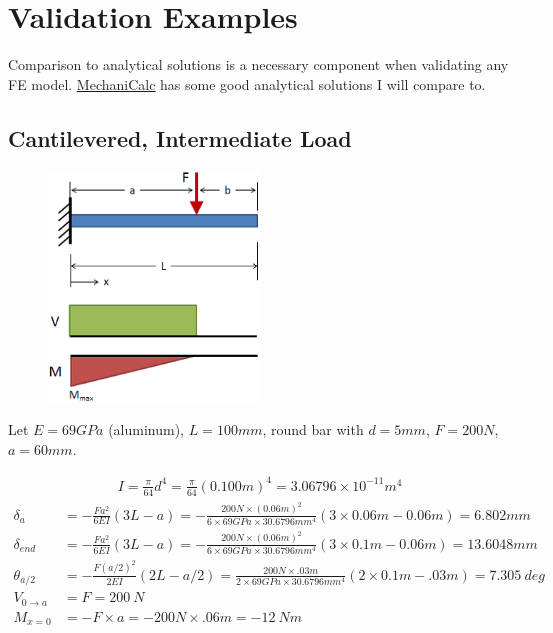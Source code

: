 \documentclass[10pt,letterpaper]{article}
\begin{document}
	\section{Validation Examples}

	Comparison to analytical solutions is a necessary component when validating any FE model. \href{https://mechanicalc.com/reference/beam-deflection-tables}{\underline{MechaniCalc}} has some good analytical solutions I will compare to.

	\newpage
	\subsection{Cantilevered, Intermediate Load}

	\begin{figure}[H]
		\includegraphics[width=0.5\textwidth]{beam_case1_schematic.png}
	\end{figure}

	Let $E = 69 GPa$ (aluminum), $L = 100 mm$, round bar with $d = 5 mm$, $F = 200 N$, $a = 60mm$.

	\begin{align}
		I = \frac{\pi}{64} d^4 = \frac{\pi}{64} (0.100 m)^4 = 3.06796 \times 10^{-11} m^4
	\end{align}
	\begin{align}
		\delta_{a} &= - \frac{F a^2}{6 E I} (3 L - a) = - \frac{200 N \times (0.06 m)^2}{6 \times 69 GPa \times 30.6796 mm^4} (3 \times 0.06 m - 0.06 m) = 6.802 mm\\
		\delta_{end} &= - \frac{F a^2}{6 E I} (3 L - a) = - \frac{200 N \times (0.06 m)^2}{6 \times 69 GPa \times 30.6796 mm^4} (3 \times 0.1 m - 0.06 m) = 13.6048 mm\\
		\theta_{a/2} &= - \frac{F (a/2)^2}{2 E I} (2 L - a/2) = \frac{200 N \times .03 m}{2 \times 69 GPa \times 30.6796 mm^4} (2 \times 0.1m - .03m) = 7.305 \ deg\\
		V_{0 \rightarrow a} &= F = 200 \ N \\
		M_{x=0} &= -F \times a = - 200 N \times .06 m = - 12\ Nm
	\end{align}
\end{document}
